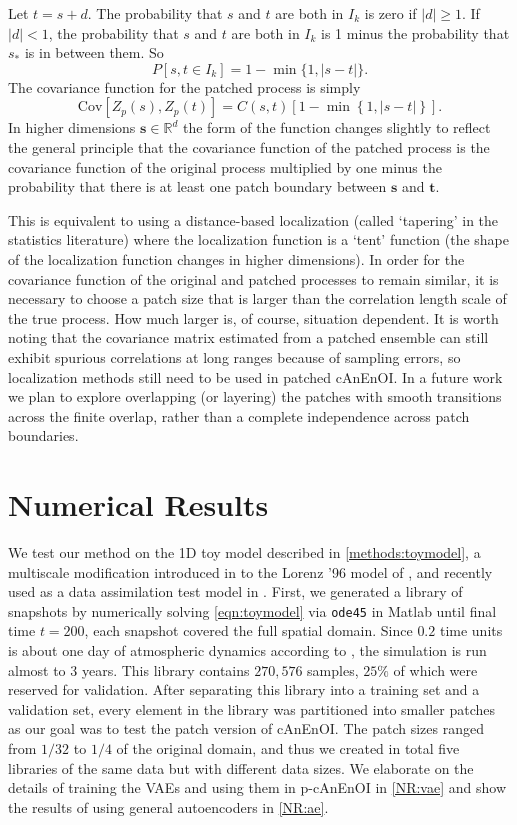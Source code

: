 \documentclass[final,3p]{elsarticle}
\theoremstyle{break}
\begin{document}
Let $t=s+d$.
The probability that $s$ and $t$ are both in $I_{k}$ is zero if $|d|\ge1$.
If $|d|<1$, the probability that $s$ and $t$ are both in $I_{k}$ is 1 minus the probability that $s_*$ is in between them.
So
\[P[s,t\in I_{k}] = 1 - \min\{1,|s-t|\}.\]
The covariance function for the patched process is simply
\begin{equation}
    \text{Cov}[Z_p(s),Z_p(t)] = C(s,t)\left[1 - \min\left\{1,|s-t|\right\}\right].\label{eqn:PatchedCovariance}
\end{equation}
In higher dimensions $\bm{s}\in\mathbb{R}^d$ the form of the function changes slightly to reflect the general principle that the covariance function of the patched process is the covariance function of the original process multiplied by one minus the probability that there is at least one patch boundary between $\bm{s}$ and $\bm{t}$.

This is equivalent to using a distance-based localization (called `tapering' in the statistics literature) where the localization function is a `tent' function (the shape of the localization function changes in higher dimensions).
In order for the covariance function of the original and patched processes to remain similar, it is necessary to choose a patch size that is larger than the correlation length scale of the true process.
How much larger is, of course, situation dependent.
It is worth noting that the covariance matrix estimated from a patched ensemble can still exhibit spurious correlations at long ranges because of sampling errors, so localization methods still need to be used in patched cAnEnOI.
In a future work we plan to explore overlapping (or layering) the patches with smooth transitions across the finite overlap, rather than a complete independence across patch boundaries.

\section{Numerical Results}
\label{sec:NR}
We test our method on the 1D toy model described in \cref{methods:toymodel}, a multiscale modification introduced in \cite{grooms2015framework} to the Lorenz '96 model of \cite{lorenz1996predictability}, and recently used as a data assimilation test model in \cite{grooms2020analog,robinson2020hybrid}.
First, we generated a library of snapshots by numerically solving \cref{eqn:toymodel} via {\tt ode45} in Matlab until final time $t=200$, each snapshot covered the full spatial domain.
Since $0.2$ time units is about one day of atmospheric dynamics according to \cite{lorenz1996predictability}, the simulation is run almost to $3$ years.
This library contains $270,576$ samples, $25\%$ of which were reserved for validation. 
After separating this library into a training set and a validation set, every element in the library was partitioned into smaller patches as our goal was to test the patch version of cAnEnOI.
The patch sizes ranged from $1/32$ to $1/4$ of the original domain, and thus we created in total five libraries of the same data but with different data sizes.
We elaborate on the details of training the VAEs and using them in p-cAnEnOI in \cref{NR:vae} and show the results of using general autoencoders in \cref{NR:ae}.
\end{document}
